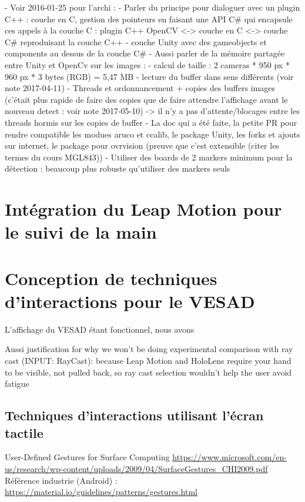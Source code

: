 - Voir 2016-01-25 pour l'archi :
  - Parler du principe pour dialoguer avec un plugin C++ : couche en C, gestion des pointeurs en faisant une API C\# qui encapsule ces appels à la couche C : plugin C++ OpenCV <-> couche en C <-> couche C\# reproduisant la couche C++ 
  - couche Unity avec des gameobjects et components au dessus de la couche C\#
- Aussi parler de la mémoire partagée entre Unity et OpenCv sur les images :
  - calcul de taille : 2 cameras * 950 px * 960 px * 3 bytes (RGB) = 5,47 MB
  - lecture du buffer dans sens différents (voir note 2017-04-11)
  - Threads et ordonnancement + copies des buffers images (c'était plus rapide de faire des copies que de faire attendre l'affichage avant le nouveau detect : voir note 2017-05-10) -> il n'y a pas d'attente/blocages entre les threads hormis sur les copies de buffer
- La doc qui a été faite, la petite PR pour rendre compatible les modues aruco et ccalib, le package Unity, les forks et ajouts sur internet, le package pour ovrvision (preuve que c'est extensible (citer les termes du cours MGL843))
- Utiliser des boards de 2 markers minimum pour la détection : beaucoup plus robuste qu'utiliser des markers seuls


\section{Intégration du Leap Motion pour le suivi de la main}


\section{Conception de techniques d'interactions pour le VESAD}
L'affichage du VESAD étant fonctionnel, nous avons 

Aussi justification for why we won’t be doing experimental comparison with ray cast (INPUT: RayCast): because Leap Motion and HoloLens require your hand to be visible, not pulled back, so ray cast selection wouldn’t help the user avoid fatigue

\subsection{Techniques d'interactions utilisant l'écran tactile}
User-Defined Gestures for Surface Computing \url{https://www.microsoft.com/en-us/research/wp-content/uploads/2009/04/SurfaceGestures_CHI2009.pdf}
Référence industrie (Android) : \url{https://material.io/guidelines/patterns/gestures.html}

